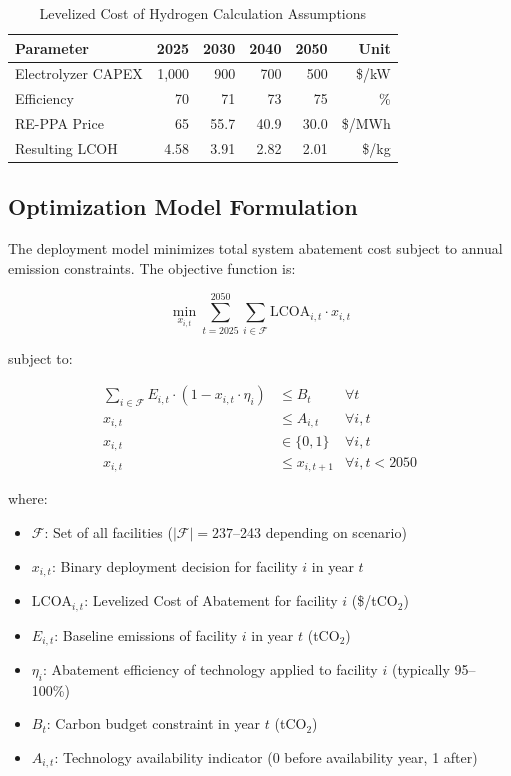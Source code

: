 \documentclass[12pt,a4paper]{article}
\begin{document}
\begin{table}[H]
\centering
\caption{Levelized Cost of Hydrogen Calculation Assumptions}
\label{tab:lcoh_assumptions}
\begin{tabular}{@{}lrrrrr@{}}
\toprule
\textbf{Parameter} & \textbf{2025} & \textbf{2030} & \textbf{2040} & \textbf{2050} & \textbf{Unit} \\
\midrule
Electrolyzer CAPEX & 1,000 & 900 & 700 & 500 & \$/kW \\
Efficiency & 70 & 71 & 73 & 75 & \% \\
RE-PPA Price & 65 & 55.7 & 40.9 & 30.0 & \$/MWh \\
Resulting LCOH & 4.58 & 3.91 & 2.82 & 2.01 & \$/kg \\
\bottomrule
\end{tabular}
\end{table}

\subsection{Optimization Model Formulation}

The deployment model minimizes total system abatement cost subject to annual emission constraints. The objective function is:

\begin{equation}
\min_{x_{i,t}} \sum_{t=2025}^{2050} \sum_{i \in \mathcal{F}} \text{LCOA}_{i,t} \cdot x_{i,t}
\label{eq:objective}
\end{equation}

subject to:

\begin{align}
\sum_{i \in \mathcal{F}} E_{i,t} \cdot (1 - x_{i,t} \cdot \eta_i) &\leq B_t & \forall t \label{eq:emission_constraint}\\
x_{i,t} &\leq A_{i,t} & \forall i, t \label{eq:availability}\\
x_{i,t} &\in \{0, 1\} & \forall i, t \label{eq:binary}\\
x_{i,t} &\leq x_{i,t+1} & \forall i, t < 2050 \label{eq:irreversibility}
\end{align}

where:
\begin{itemize}
\item $\mathcal{F}$: Set of all facilities ($|\mathcal{F}| = 237$--243 depending on scenario)
\item $x_{i,t}$: Binary deployment decision for facility $i$ in year $t$
\item $\text{LCOA}_{i,t}$: Levelized Cost of Abatement for facility $i$ (\$/tCO$_2$)
\item $E_{i,t}$: Baseline emissions of facility $i$ in year $t$ (tCO$_2$)
\item $\eta_i$: Abatement efficiency of technology applied to facility $i$ (typically 95--100\%)
\item $B_t$: Carbon budget constraint in year $t$ (tCO$_2$)
\item $A_{i,t}$: Technology availability indicator (0 before availability year, 1 after)
\end{itemize}
\end{document}
